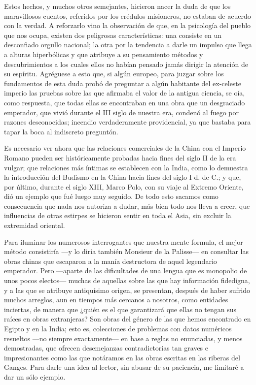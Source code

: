 \documentclass[a4paper, 12pt, draft]{article}
\begin{document}
{Estos hechos, y muchos otros semejantes, hicieron nacer la duda de que los maravillosos cuentos, referidos por los crédulos misioneros, no estaban de acuerdo con la verdad. A reforzarlo vino la observación de que,
en la psicología del pueblo que nos 
ocupa, existen dos peligrosas características: una consiste en un desconfiado orgullo nacional; la otra por la tendencia a darle un impulso que llega a alturas hiperbólicas y que atribuye a su pensamiento métodos y descubrimientos a los cuales ellos no habían pensado jamás dirigir la atención de su espíritu. Agréguese a esto que, si algún europeo, para juzgar sobre los fundamentos de esta duda probó de preguntar a algún habitante del ex-celeste imperio las pruebas sobre las que afirmaba el valor de la antigua ciencia, se oía, como respuesta, que todas ellas se encontraban en una obra que un desgraciado emperador, que vivió durante el III siglo de nuestra era, condenó al fuego por razones desconocidas; incendio verdaderamente providencial, ya que bastaba para tapar la boca al indiscreto preguntón.

Es necesario ver ahora que las relaciones comerciales de la China con el Imperio Romano pueden ser históricamente probadas hacia fines del siglo II de la era vulgar; que relaciones más íntimas se establecen con la India, como lo demuestra la introducción del Budismo en la China hacia fines del siglo I d. de C.; y que, por último, durante el siglo XIII, Marco Polo, con su viaje al Extremo Oriente, dió un ejemplo que fué luego muy seguido. De todo esto sacamos como consecuencia que nada nos autoriza a dudar, más bien todo nos lleva a creer, que influencias de otras estirpes se hicieron sentir en toda el Asia, sin excluir la extremidad oriental.

Para iluminar los numerosos interrogantes que nuestra mente formula, el mejor método consistiría ---y lo diría también Monsieur de la Palisse--- en consultar las obras chinas que escaparon a la manía destructora de aquel legendario emperador. Pero ---aparte de las dificultades de una lengua que es monopolio de unos pocos electos--- muchas de aquellas sobre las que hay información fidedigna, y a las que se atribuye antiquísimo origen, se presentan, después de haber sufrido muchos arreglos, aun en tiempos más cercanos a nosotros, como entidades inciertas, de manera que ¿quién es el que garantizará que ellas no tengan sus raíces en obras extranjeras? Son obras del género de las que hemos encontrado en Egipto y en la India; esto es, colecciones de problemas con datos numéricos resueltos ---no siempre exactamente--- en base a reglas no enunciadas, y menos demostradas, que ofrecen desemejanzas contradictorias tan graves e impresionantes como las que notáramos en las obras escritas en las riberas del Ganges. Para darle una idea al lector, sin abusar de su paciencia, me limitaré a dar un sólo ejemplo.

}
\end{document}
